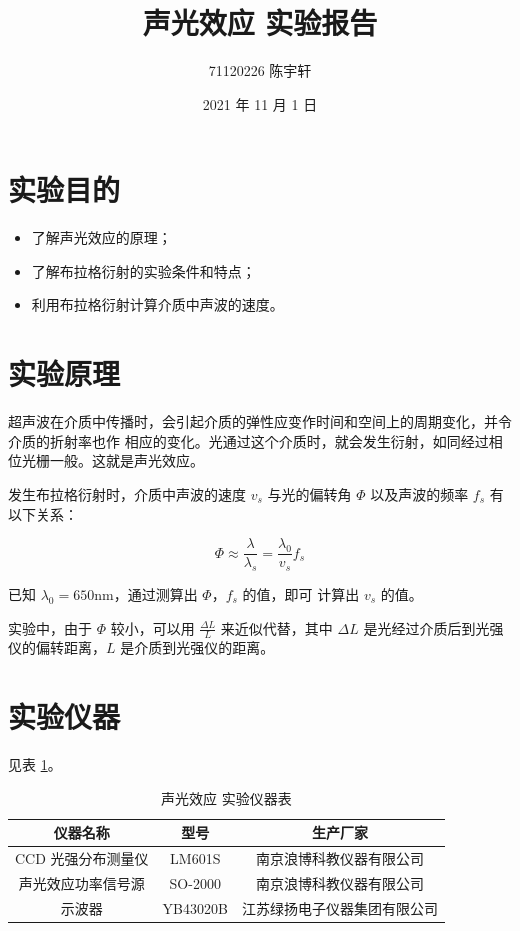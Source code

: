 \documentclass[12pt]{ctexart}
\title{声光效应 实验报告}
\author{71120226 陈宇轩}
\date{2021 年 11 月 1 日}
\begin{document}
    \maketitle

    \section{实验目的}

    \begin{itemize}
        \item 了解声光效应的原理；
        \item 了解布拉格衍射的实验条件和特点；
        \item 利用布拉格衍射计算介质中声波的速度。
    \end{itemize}

    \section{实验原理}

    超声波在介质中传播时，会引起介质的弹性应变作时间和空间上的周期变化，并令介质的折射率也作
    相应的变化。光通过这个介质时，就会发生衍射，如同经过相位光栅一般。这就是声光效应。

    发生布拉格衍射时，介质中声波的速度 $v_s$ 与光的偏转角 $\Phi$ 以及声波的频率 $f_s$
    有以下关系：

    \begin{equation}
        \Phi \approx \frac{\lambda}{\lambda_s} = \frac{\lambda_0}{v_s}f_s
    \end{equation}

    已知 $\lambda_0 = 650\mathrm{nm}$，通过测算出 $\Phi$，$f_s$ 的值，即可
    计算出 $v_s$ 的值。

    实验中，由于 $\Phi$ 较小，可以用 $\frac{\Delta L}{L}$ 来近似代替，其中 $\Delta L$
    是光经过介质后到光强仪的偏转距离，$L$ 是介质到光强仪的距离。

    \section{实验仪器}

    见表 \ref{components}。

    \begin{table}[hp]
        \centering
        \caption{声光效应 实验仪器表}
        \label{components}
        \begin{tabular}{|c|c|c|}
            \hline
            仪器名称 & 型号 & 生产厂家 \\ \hline
            CCD 光强分布测量仪 & LM601S & 南京浪博科教仪器有限公司 \\ \hline
            声光效应功率信号源 & SO-2000 & 南京浪博科教仪器有限公司 \\ \hline
            示波器 & YB43020B & 江苏绿扬电子仪器集团有限公司 \\ \hline
        \end{tabular}
    \end{table}
\end{document}
